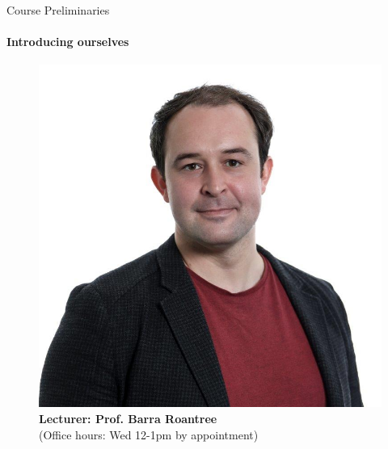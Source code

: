 \documentclass[11pt,english,handout]{beamer}
\begin{document}
\begin{frame}{Course Preliminaries}
\framesubtitle{Introducing ourselves}
\vspace{0.2cm}

	\begin{figure}
		\begin{minipage}{0.45\textwidth}
			\centering
			\includegraphics[width=\textwidth]{headshot_roantree.jpg}
			\caption*{\textbf{Lecturer: Prof. Barra Roantree} \\ (Office hours: Wed 12-1pm by appointment)}			
		\end{minipage}
		\hfill
		\begin{minipage}{0.45\textwidth}
			\centering

\end{minipage}
\end{figure}
\end{frame}
\end{document}
